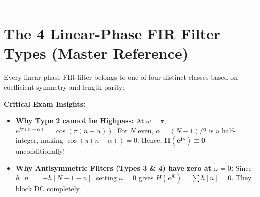 \documentclass[11pt,a4paper]{article}
\begin{document}
\noindent\rule{\textwidth}{0.5pt}

\section{The 4 Linear-Phase FIR Filter Types (Master Reference)}

Every linear-phase FIR filter belongs to one of four distinct classes based on coefficient symmetry and length parity:

\begin{table}[H]
\centering
\caption{Classification and Filter Suitability of Linear-Phase FIR Filters}
\label{tab:fir_types}
\vspace{2mm}
\end{table}

\noindent\textbf{Critical Exam Insights:}
\begin{itemize}
    \item \textbf{Why Type 2 cannot be Highpass:} At $\omega = \pi$, $e^{j\pi(n - \alpha)} = \cos(\pi(n - \alpha))$. For $N$ even, $\alpha = (N-1)/2$ is a half-integer, making $\cos(\pi(n - \alpha)) = 0$. Hence, $\mathbf{H(e^{j\pi}) \equiv 0}$ unconditionally!
    \item \textbf{Why Antisymmetric Filters (Types 3 \& 4) have zero at $\omega = 0$:} Since $h[n] = -h[N-1-n]$, setting $\omega = 0$ gives $H(e^{j0}) = \sum h[n] = 0$. They block DC completely.
\end{itemize}
\end{document}
